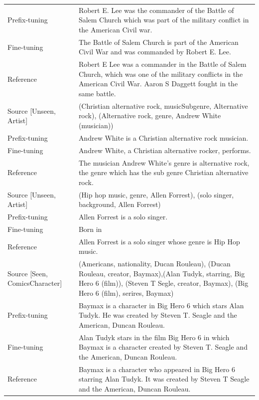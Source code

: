 \documentclass[11pt,a4paper]{article}
\begin{document}
\begin{table}[]
{\begin{tabular}{lp{17cm}}
        Prefix-tuning &  Robert E. Lee was the commander of the Battle of Salem Church which was part of the military conflict in the American Civil war.\\ 

        Fine-tuning   &  The Battle of Salem Church is part of the American Civil War and was commanded by Robert E. Lee.\\ 
        Reference   & Robert E Lee was a commander in the Battle of Salem Church, which was one of the military conflicts in the American Civil War. Aaron S Daggett fought in the same battle. \\ 

        \toprule
        Source [Unseen, Artist]  &  (Christian alternative rock, musicSubgenre, Alternative rock), (Alternative rock, genre, Andrew White (musician))\\
        \midrule

        Prefix-tuning &  Andrew White is a Christian alternative rock musician.\\ 

        Fine-tuning   &  Andrew White, a Christian alternative rocker, performs.\\ 
        Reference   & The musician Andrew White's genre is alternative rock, the genre which has the sub genre Christian alternative rock.\\ 
        \toprule
        Source [Unseen, Artist]  &  (Hip hop music, genre, Allen Forrest),  (solo singer, background, Allen Forrest) \\
        \midrule

        Prefix-tuning &  Allen Forrest is a solo singer.\\ 

        Fine-tuning   &  Born in\\ 
        Reference   & Allen Forrest is a solo singer whose genre is Hip Hop music.\\ 
        \toprule
        Source [Seen, ComicsCharacter]  &  (Americans, nationality, Ducan Rouleau),  (Ducan Rouleau, creator, Baymax),(Alan Tudyk, starring, Big Hero 6 (film)), (Steven T Segle, creator, Baymax), (Big Hero 6 (film), serires, Baymax) \\
        \midrule

        Prefix-tuning &  Baymax is a character in Big Hero 6 which stars Alan Tudyk. He was created by Steven T. Seagle and the American, Duncan Rouleau.\\
        Fine-tuning   &  Alan Tudyk stars in the film Big Hero 6 in which Baymax is a character created by Steven T. Seagle and the American, Duncan Rouleau.\\ 
        Reference   & Baymax is a character who appeared in Big Hero 6 starring Alan Tudyk. It was created by Steven T Seagle and the American, Duncan Rouleau.\\ 


\end{tabular}}
\end{table}
\end{document}
